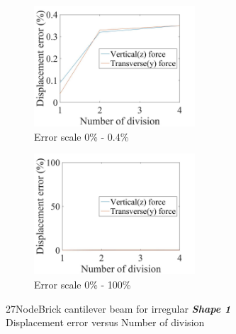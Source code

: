 \documentclass[fleqn,11pt]{article}
\begin{document}
\begin{figure}[H]
  \begin{subfigure}{0.5\textwidth}
    \centering
    \includegraphics[width=6cm]{../Figure-files/error27brick_beam_irregular_shape1.jpeg}
    \caption{Error scale 0\% - 0.4\%}
  \end{subfigure}
  \begin{subfigure}{0.5\textwidth}
    \centering
    \includegraphics[width=6cm]{../Figure-files/error27brick_beam_irregular_shape1100.jpeg}
    \caption{Error scale 0\% - 100\%}
  \end{subfigure}
  \captionsetup{justification=centering,margin=3cm}
  \caption{27NodeBrick cantilever beam for irregular \textbf{\emph{Shape 1}}\\
      Displacement error   versus   Number of division}
  \label{fig shape 1 27NodeBrick cantilever beam for irregular more elements}
\end{figure}


\end{document}
